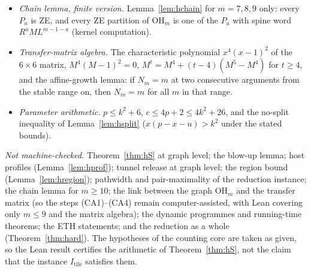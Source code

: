 \begin{itemize}
\item \emph{Chain lemma, finite version.} Lemma~\ref{lem:hchain} for $m=7,8,9$ only: every $P_a$ is ZE, and every ZE partition of $\mathrm{OH}_m$ is one of the $P_a$ with spine word $R^aML^{m-1-a}$ (kernel computation).
\item \emph{Transfer-matrix algebra.} The characteristic polynomial $x^4(x-1)^2$ of the $6\times6$ matrix, $M^4(M-1)^2=0$, $M^t=M^4+(t-4)(M^5-M^4)$ for $t\ge4$, and the affine-growth lemma: if $N_m=m$ at two consecutive arguments from the stable range on, then $N_m=m$ for all $m$ in that range.
\item \emph{Parameter arithmetic.} $p\le k^2+6$, $c\le4p+2\le4k^2+26$, and the no-split inequality of Lemma~\ref{lem:hsplit} ($x(p-x-u)>k^2$ under the stated bounds).
\end{itemize}

\emph{Not machine-checked.} Theorem~\ref{thm:hS} at graph level; the blow-up lemma; host profiles (Lemma~\ref{lem:hprof}); tunnel release at graph level; the region bound (Lemma~\ref{lem:hregion}); pathwidth and pair-maximality of the reduction instance; the chain lemma for $m\ge10$; the link between the graph $\mathrm{OH}_m$ and the transfer matrix (so the steps (CA1)--(CA4) remain computer-assisted, with Lean covering only $m\le9$ and the matrix algebra); the dynamic programmes and running-time theorems; the ETH statements; and the reduction as a whole (Theorem~\ref{thm:hard}). The hypotheses of the counting core are taken as given, so the Lean result certifies the arithmetic of Theorem~\ref{thm:hS}, not the claim that the instance $I_{\mathrm{tile}}$ satisfies them.
